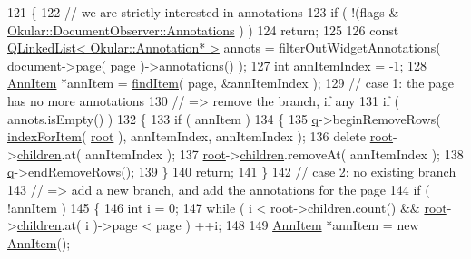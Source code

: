 \begin{DoxyCode}
121 \{
122     \textcolor{comment}{// we are strictly interested in annotations}
123     \textcolor{keywordflow}{if} ( !(flags & \hyperlink{classOkular_1_1DocumentObserver_af0e6b09d5fc7ecb673bd4895ef2710dca05bd23206e8303026c0b598095d8552e}{Okular::DocumentObserver::Annotations} ) )
124         \textcolor{keywordflow}{return};
125 
126     \textcolor{keyword}{const} \hyperlink{classQLinkedList}{QLinkedList< Okular::Annotation* >} annots = 
      filterOutWidgetAnnotations( \hyperlink{classAnnotationModelPrivate_ad9d0730baf8663b0c3485d72ac4e05c6}{document}->page( page )->annotations() );
127     \textcolor{keywordtype}{int} annItemIndex = -1;
128     \hyperlink{structAnnItem}{AnnItem} *annItem = \hyperlink{classAnnotationModelPrivate_a082a44f62811ca44738a656492e03916}{findItem}( page, &annItemIndex );
129     \textcolor{comment}{// case 1: the page has no more annotations}
130     \textcolor{comment}{//         => remove the branch, if any}
131     \textcolor{keywordflow}{if} ( annots.isEmpty() )
132     \{
133         \textcolor{keywordflow}{if} ( annItem )
134         \{
135             \hyperlink{classAnnotationModelPrivate_a106e8bd7ef602e10239b11d4a775647d}{q}->beginRemoveRows( \hyperlink{classAnnotationModelPrivate_a49c3cbd8328e431324be4fff9ac25926}{indexForItem}( \hyperlink{classAnnotationModelPrivate_a35aef72ee0aebe05b6e0fa2c50c19f75}{root} ), annItemIndex, annItemIndex );
136             \textcolor{keyword}{delete} \hyperlink{classAnnotationModelPrivate_a35aef72ee0aebe05b6e0fa2c50c19f75}{root}->\hyperlink{structAnnItem_a11048051ad0be5a2c8607a9334e006a1}{children}.at( annItemIndex );
137             \hyperlink{classAnnotationModelPrivate_a35aef72ee0aebe05b6e0fa2c50c19f75}{root}->\hyperlink{structAnnItem_a11048051ad0be5a2c8607a9334e006a1}{children}.removeAt( annItemIndex );
138             \hyperlink{classAnnotationModelPrivate_a106e8bd7ef602e10239b11d4a775647d}{q}->endRemoveRows();
139         \}
140         \textcolor{keywordflow}{return};
141     \}
142     \textcolor{comment}{// case 2: no existing branch}
143     \textcolor{comment}{//         => add a new branch, and add the annotations for the page}
144     \textcolor{keywordflow}{if} ( !annItem )
145     \{
146         \textcolor{keywordtype}{int} i = 0;
147         \textcolor{keywordflow}{while} ( i < root->children.count() && \hyperlink{classAnnotationModelPrivate_a35aef72ee0aebe05b6e0fa2c50c19f75}{root}->\hyperlink{structAnnItem_a11048051ad0be5a2c8607a9334e006a1}{children}.at( i )->page < page ) ++i;
148 
149         \hyperlink{structAnnItem}{AnnItem} *annItem = \textcolor{keyword}{new} \hyperlink{structAnnItem}{AnnItem}();

\end{DoxyCode}
